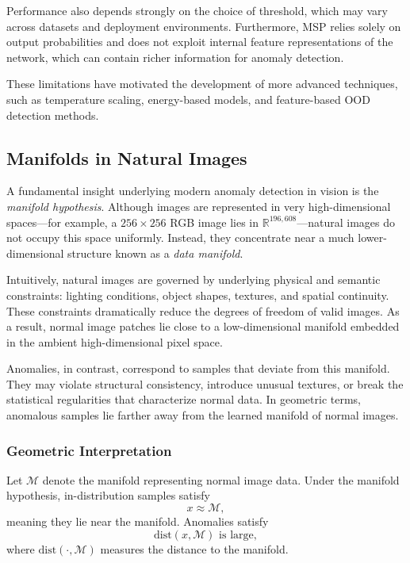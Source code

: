 \documentclass{article}
\begin{document}
Performance also depends strongly on the choice of threshold, which may vary
across datasets and deployment environments. Furthermore, MSP relies solely on
output probabilities and does not exploit internal feature representations of
the network, which can contain richer information for anomaly detection.

These limitations have motivated the development of more advanced techniques,
such as temperature scaling, energy-based models, and feature-based OOD
detection methods.

\subsection{Manifolds in Natural Images}

A fundamental insight underlying modern anomaly detection in vision is the
\emph{manifold hypothesis}. Although images are represented in very
high-dimensional spaces—for example, a $256\times256$ RGB image lies in
$\mathbb{R}^{196{,}608}$—natural images do not occupy this space uniformly.
Instead, they concentrate near a much lower-dimensional structure known as a
\emph{data manifold}.

Intuitively, natural images are governed by underlying physical and semantic
constraints: lighting conditions, object shapes, textures, and spatial
continuity. These constraints dramatically reduce the degrees of freedom of
valid images. As a result, normal image patches lie close to a low-dimensional
manifold embedded in the ambient high-dimensional pixel space.

Anomalies, in contrast, correspond to samples that deviate from this manifold.
They may violate structural consistency, introduce unusual textures, or break
the statistical regularities that characterize normal data. In geometric terms,
anomalous samples lie farther away from the learned manifold of normal images.

\subsubsection{Geometric Interpretation}

Let $\mathcal{M}$ denote the manifold representing normal image data.
Under the manifold hypothesis, in-distribution samples satisfy
\[
x \approx \mathcal{M},
\]
meaning they lie near the manifold. Anomalies satisfy
\[
\text{dist}(x, \mathcal{M}) \text{ is large},
\]
where $\text{dist}(\cdot,\mathcal{M})$ measures the distance to the manifold.
\end{document}
